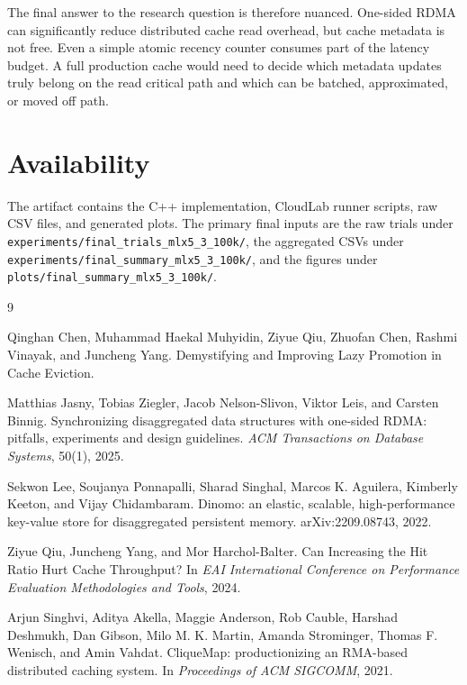 \documentclass[letterpaper,twocolumn,10pt]{article}
\begin{document}
The final answer to the research question is therefore nuanced.  One-sided
RDMA can significantly reduce distributed cache read overhead, but cache
metadata is not free.  Even a simple atomic recency counter consumes part of
the latency budget.  A full production cache would need to decide which
metadata updates truly belong on the read critical path and which can be
batched, approximated, or moved off path.

\section*{Availability}

The artifact contains the C++ implementation, CloudLab runner scripts, raw CSV
files, and generated plots.  The primary final inputs are the raw trials under
\texttt{experiments/final\_trials\_mlx5\_3\_100k/}, the aggregated CSVs under
\texttt{experiments/final\_summary\_mlx5\_3\_100k/}, and the figures under
\texttt{plots/final\_summary\_mlx5\_3\_100k/}.

\begin{thebibliography}{9}

Qinghan Chen, Muhammad Haekal Muhyidin, Ziyue Qiu, Zhuofan Chen, Rashmi
Vinayak, and Juncheng Yang.
\newblock Demystifying and Improving Lazy Promotion in Cache Eviction.

Matthias Jasny, Tobias Ziegler, Jacob Nelson-Slivon, Viktor Leis, and Carsten
Binnig.
\newblock Synchronizing disaggregated data structures with one-sided RDMA:
pitfalls, experiments and design guidelines.
\newblock \emph{ACM Transactions on Database Systems}, 50(1), 2025.

Sekwon Lee, Soujanya Ponnapalli, Sharad Singhal, Marcos K. Aguilera, Kimberly
Keeton, and Vijay Chidambaram.
\newblock Dinomo: an elastic, scalable, high-performance key-value store for
disaggregated persistent memory.
\newblock arXiv:2209.08743, 2022.

Ziyue Qiu, Juncheng Yang, and Mor Harchol-Balter.
\newblock Can Increasing the Hit Ratio Hurt Cache Throughput?
\newblock In \emph{EAI International Conference on Performance Evaluation
Methodologies and Tools}, 2024.

Arjun Singhvi, Aditya Akella, Maggie Anderson, Rob Cauble, Harshad Deshmukh,
Dan Gibson, Milo M. K. Martin, Amanda Strominger, Thomas F. Wenisch, and Amin
Vahdat.
\newblock CliqueMap: productionizing an RMA-based distributed caching system.
\newblock In \emph{Proceedings of ACM SIGCOMM}, 2021.

\end{thebibliography}

\end{document}
